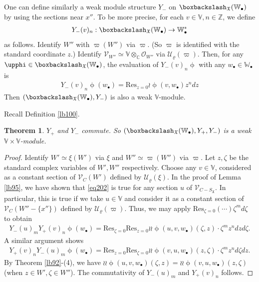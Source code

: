 \documentclass[12pt,b5paper,notitlepage]{report}
\theoremstyle{definition}
\theoremstyle{plain}
\newtheorem{thm}[df]{Theorem}
\newcommand{\fk}{\mathfrak}
\newcommand{\mc}{\mathcal}
\newcommand{\Res}{\mathrm{Res}}
\newcommand{\scr}{\mathscr}
\newcommand{\SX}{S_{\fk X}}
\newcommand{\blt}{\bullet}
\newcommand{\Vbb}{\mathbb V}
\newcommand{\Wbb}{\mathbb W}
\newcommand{\Cbb}{\mathbb C}
\newcommand{\Zbb}{\mathbb Z}
\numberwithin{equation}{section}
\begin{document}
One can define similarly a weak module structure $Y_-$ on $\boxbackslash_{\fk X}(\Wbb_\blt)$ by using the sections near $x''$. To be more precise, for each $v\in\Vbb,n\in\Zbb$, we define
\begin{gather*}
Y_-(v)_n:\boxbackslash_{\fk X}(\Wbb_\blt)\rightarrow\Wbb_\blt^*
\end{gather*}
as follows. Identify $W''$ with $\varpi(W'')$ via $\varpi$. (So $\varpi$ is identified with the standard coordinate $z$.) Identify  $\scr V_{W''}\simeq\Vbb\otimes_\Cbb\scr O_{W''}$ via $\mc U_\varrho(\varpi)$.  Then, for any $\upphi\in\boxbackslash_{\fk X}(\Wbb_\blt)$, the evaluation of $Y_-(v)_n\upphi$ with any $w_\blt\in\Wbb_\blt$ is
\begin{gather}
\boxed{~~Y_-(v)_n\upphi(w_\blt)=\Res_{z=0}\wr\upphi( v,w_\blt)z^ndz~~}\label{eq213}
\end{gather}
Then $(\boxbackslash_{\fk X}(\Wbb_\blt),Y_-)$ is also a weak $\Vbb$-module.

Recall Definition \ref{lb100}.

\begin{thm}
$Y_+$ and $Y_-$ commute. So $(\boxbackslash_{\fk X}(\Wbb_\blt),Y_+,Y_-)$ is a weak $\Vbb\times\Vbb$-module.
\end{thm}


\begin{proof}
Identify $W'\simeq \xi(W')$ via $\xi$ and $W''\simeq\varpi(W'')$ via $\varpi$. Let $z,\zeta$ be the standard complex variables of $W',W''$ respectively.  Choose any $v\in\Vbb$, considered as a constant section of $\scr V_C(W')$ defined by $\mc U_\varrho(\xi)$.  In the proof of Lemma \ref{lb95}, we have shown that \eqref{eq202} is true for any section $u$ of $\scr V_{C-\SX}$. In particular, this is true if we take $u\in\Vbb$ and consider it as a constant section of $\scr V_C(W''-\{x''\})$ defined by $\mc U_\varrho(\varpi)$.  Thus, we may apply $\Res_{\zeta=0}(\cdots)\zeta^md\zeta$ to obtain
\begin{align*}
Y_-(u)_m Y_+(v)_n\upphi(w_\blt)=\Res_{\zeta=0}\Res_{z=0}\wr\wr\upphi(u,v,w_\blt)(\zeta,z)\cdot \zeta^m z^n dzd\zeta.
\end{align*}
A similar argument shows
\begin{align*}
Y_+(v)_nY_-(u)_m\upphi(w_\blt)=\Res_{z=0}\Res_{\zeta=0}\wr\wr\upphi(v,u,w_\blt)(z,\zeta)\cdot\zeta^m z^n d\zeta dz.
\end{align*}
By Theorem \ref{lb92}-(4), we have $\wr\wr\upphi(u,v,w_\blt)(\zeta,z)=\wr\wr\upphi(v,u,w_\blt)(z,\zeta)$ (when $z\in W',\zeta\in W''$). The commutativity of  $Y_-(u)_m$ and $Y_+(v)_n$ follows.
\end{proof}
\end{document}
